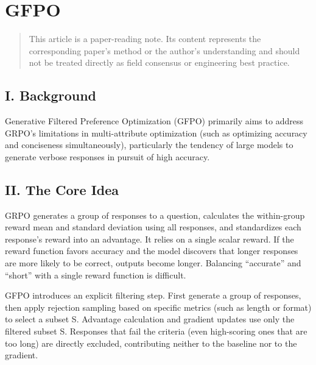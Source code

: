 \setcounter{section}{3}

\hypertarget{gfpo}{%
\section{GFPO}\label{gfpo}}

\begin{quote}
This article is a paper-reading note. Its content represents the corresponding paper's method or the author's understanding and should not be treated directly as field consensus or engineering best practice.
\end{quote}

\hypertarget{i.-background-4}{%
\subsection{I. Background}\label{i.-background-4}}

Generative Filtered Preference Optimization (GFPO) primarily aims to address GRPO's limitations in multi-attribute optimization (such as optimizing accuracy and conciseness simultaneously), particularly the tendency of large models to generate verbose responses in pursuit of high accuracy.

\hypertarget{ii.-the-core-idea-1}{%
\subsection{II. The Core Idea}\label{ii.-the-core-idea-1}}

GRPO generates a group of responses to a question, calculates the within-group reward mean and standard deviation using all responses, and standardizes each response's reward into an advantage. It relies on a single scalar reward. If the reward function favors accuracy and the model discovers that longer responses are more likely to be correct, outputs become longer. Balancing ``accurate'' and ``short'' with a single reward function is difficult.

GFPO introduces an explicit filtering step. First generate a group of responses, then apply rejection sampling based on specific metrics (such as length or format) to select a subset S. Advantage calculation and gradient updates use only the filtered subset S. Responses that fail the criteria (even high-scoring ones that are too long) are directly excluded, contributing neither to the baseline nor to the gradient.

